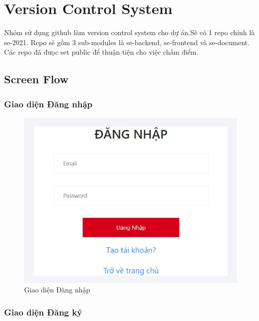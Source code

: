\documentclass[a4paper]{article}
\begin{document}









\section{Version Control System}

Nhóm sử dụng github làm version control system cho dự án.Sẽ có 1 repo chính là se-2021. Repo sẽ gồm 3 sub-modules là se-backend, se-frontend và se-document. Các repo đã đưọc set public để thuận tiện cho việc chấm điểm.
\newpage
\subsection{Screen Flow}
\subsubsection{Giao diện Đăng nhập}

\begin{figure}[!h]
    \begin{center}
        \includegraphics[scale=0.6]{Images/screen_flow/login.jpg}
    \end{center}
    \hspace{0.3cm}
    \caption{Giao diện Đăng nhập}
\end{figure}

\subsubsection{Giao diện Đăng ký}
\end{document}
